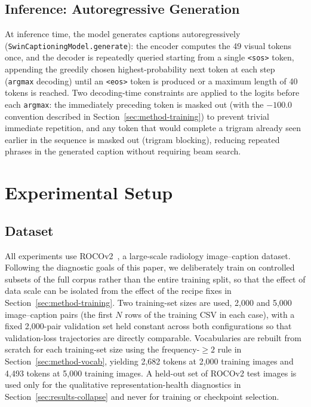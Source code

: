 \documentclass[conference]{IEEEtran}
\begin{document}
\subsection{Inference: Autoregressive Generation}
\label{sec:method-inference}

At inference time, the model generates captions autoregressively (\texttt{SwinCaptioningModel.generate}): the encoder computes the 49 visual tokens once, and the decoder is repeatedly queried starting from a single \texttt{<sos>} token, appending the greedily chosen highest-probability next token at each step (\texttt{argmax} decoding) until an \texttt{<eos>} token is produced or a maximum length of 40 tokens is reached. Two decoding-time constraints are applied to the logits before each \texttt{argmax}: the immediately preceding token is masked out (with the $-100.0$ convention described in Section~\ref{sec:method-training}) to prevent trivial immediate repetition, and any token that would complete a trigram already seen earlier in the sequence is masked out (trigram blocking), reducing repeated phrases in the generated caption without requiring beam search.

\section{Experimental Setup}
\label{sec:experiments}

\subsection{Dataset}
All experiments use ROCOv2~\cite{ruckert2024rocov2}, a large-scale radiology image--caption dataset. Following the diagnostic goals of this paper, we deliberately train on controlled subsets of the full corpus rather than the entire training split, so that the effect of data scale can be isolated from the effect of the recipe fixes in Section~\ref{sec:method-training}. Two training-set sizes are used, 2,000 and 5,000 image--caption pairs (the first $N$ rows of the training CSV in each case), with a fixed 2,000-pair validation set held constant across both configurations so that validation-loss trajectories are directly comparable. Vocabularies are rebuilt from scratch for each training-set size using the frequency-$\ge2$ rule in Section~\ref{sec:method-vocab}, yielding 2,682 tokens at 2,000 training images and 4,493 tokens at 5,000 training images. A held-out set of ROCOv2 test images is used only for the qualitative representation-health diagnostics in Section~\ref{sec:results-collapse} and never for training or checkpoint selection.
\end{document}
